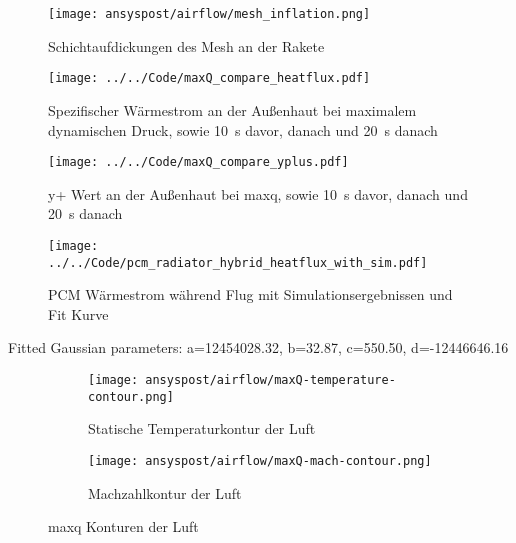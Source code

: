 \begin{figure}[H]
  \centering
  \texttt{[image: ansyspost/airflow/mesh\_inflation.png]}
  \caption{Schichtaufdickungen des Mesh an der Rakete}\label{fig:aussenstroemung_mesh_inflationlayers}
\end{figure}

\begin{figure}[H]
  \centering
  \texttt{[image: ../../Code/maxQ\_compare\_heatflux.pdf]}
  \caption{Spezifischer Wärmestrom an der Außenhaut bei maximalem dynamischen Druck, sowie \SI{10}{s} davor, danach und \SI{20}{s} danach}\label{fig:spezifischer_waermestrom_maxQ_simulationen}
\end{figure}

\begin{figure}[H]
  \centering
  \texttt{[image: ../../Code/maxQ\_compare\_yplus.pdf]}
  \caption{y+ Wert an der Außenhaut bei \ac{maxq}, sowie \SI{10}{s} davor, danach und \SI{20}{s} danach}\label{fig:yplus_maxQ_simulationen}
\end{figure}

\begin{figure}[H]
  \centering
  \texttt{[image: ../../Code/pcm\_radiator\_hybrid\_heatflux\_with\_sim.pdf]}
  \caption{PCM Wärmestrom während Flug mit Simulationsergebnissen und Fit Kurve}\label{fig:pcm_waermestrom_sim}
\end{figure}

Fitted Gaussian parameters:
a=12454028.32, b=32.87, c=550.50, d=-12446646.16

\begin{figure}[H]
    \centering

    \begin{subfigure}{\textwidth}
        \centering
        \texttt{[image: ansyspost/airflow/maxQ-temperature-contour.png]}
        \caption{Statische Temperaturkontur der Luft}
        \label{fig:maxQ_temp_contour}
    \end{subfigure}

    \begin{subfigure}{\textwidth}
        \centering
        \texttt{[image: ansyspost/airflow/maxQ-mach-contour.png]}
        \caption{Machzahlkontur der Luft}
        \label{fig:maxQ_mach_contour}
    \end{subfigure}

    \caption{\texorpdfstring{\ac{maxq}}{max Q} Konturen der Luft}
    \label{fig:maxQ_konturen}
\end{figure}

